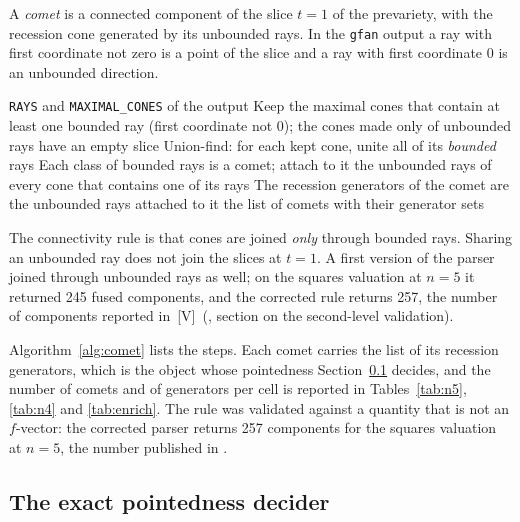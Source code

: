 \documentclass[11pt]{article}
\theoremstyle{definition}
\theoremstyle{remark}
\newcommand{\mk}[1]{\,{\scriptsize[#1]}}
\newcommand{\Vm}{\mk{V}}
\begin{document}
A \emph{comet} is a connected component of the slice $t=1$ of the prevariety, with the recession
cone generated by its unbounded rays. In the \texttt{gfan} output a ray with first coordinate not
zero is a point of the slice and a ray with first coordinate $0$ is an unbounded direction.

\begin{algorithm}[t]
\caption{Comet extraction from a \texttt{gfan} prevariety output.}\label{alg:comet}
\begin{algorithmic}[1]
\Require \texttt{RAYS} and \texttt{MAXIMAL\_CONES} of the output
\State Keep the maximal cones that contain at least one bounded ray (first coordinate not $0$);
the cones made only of unbounded rays have an empty slice
\State Union-find: for each kept cone, unite all of its \emph{bounded} rays
\State Each class of bounded rays is a comet; attach to it the unbounded rays of every cone that contains one of its rays
\State The recession generators of the comet are the unbounded rays attached to it
\Ensure the list of comets with their generator sets
\end{algorithmic}
\end{algorithm}

The connectivity rule is that cones are joined \emph{only} through bounded rays. Sharing an unbounded
ray does not join the slices at $t=1$. A first version of the parser joined through unbounded rays
as well; on the squares valuation at $n=5$ it returned 245 fused components, and the corrected rule
returns 257, the number of components reported in \cite{JL25}\Vm\
(, section on the second-level %
validation).

Algorithm~\ref{alg:comet} lists the steps. Each comet carries the list of its recession generators, which is the object whose pointedness
Section~\ref{sec:decider} decides, and the number of comets and of generators per cell is reported in Tables~\ref{tab:n5}, \ref{tab:n4} and
\ref{tab:enrich}. The rule was validated against a quantity that is not an $f$-vector: the corrected parser returns 257 components for the
squares valuation at $n=5$, the number published in \cite{JL25}.

\subsection{The exact pointedness decider}\label{sec:decider}
\end{document}
